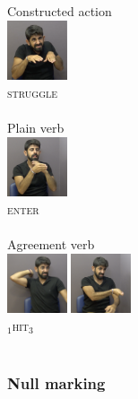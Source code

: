\documentclass[]{elsarticle} %
\begin{document}
\begin{multicols}{3}
\begin{exe}
\ex
\begin{xlist}
\ex \label{ex:9a} Constructed action \\\glll 
\includegraphics[width=50pt]{pictures/4c.png} \\ \textsc{struggle} \\ \\

\ex \label{ex:9b} Plain verb  \\\glll
\includegraphics[width=50pt]{pictures/4a_2.png}  \\ \textsc{enter}\\ \\

\ex \label{ex:9c} Agreement verb  \\\glll 
\includegraphics[width=50pt]{pictures/4b_1.png} 
\includegraphics[width=50pt]{pictures/4b_2.png} \\ {\textsc{$_{1}$hit$_{3}$}} {} \\ \\ 
\end{xlist}
\end{exe}
\end{multicols}

\hypertarget{null-marking}{%
\subsubsection{Null marking}\label{null-marking}}
\end{document}
